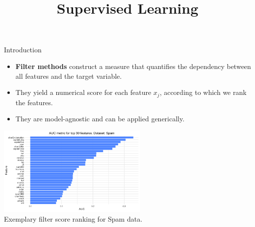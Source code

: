 \documentclass[11pt,compress,t,notes=noshow, xcolor=table]{beamer}
\title{Supervised Learning}
\date{}
\begin{document}

  \begin{vbframe}{Introduction}
  \vspace{0.4cm}
  \begin{itemize}
  \setlength{\itemsep}{0.8em}
    \item \textbf{Filter methods} construct a measure that quantifies the dependency between all features and the target variable.
    \item They yield a numerical score for each feature $x_j$, according to which we rank the features.
    \item They are model-agnostic and can be applied generically.
  \end{itemize}
  \vspace{-0.2cm}
  \begin{center}
  \includegraphics[width=0.55\textwidth]{figure/fs-auc-barplot.png}\\
  \footnotesize{Exemplary filter score ranking for Spam data.}
  \end{center}
  
  \end{vbframe}
\end{document}
